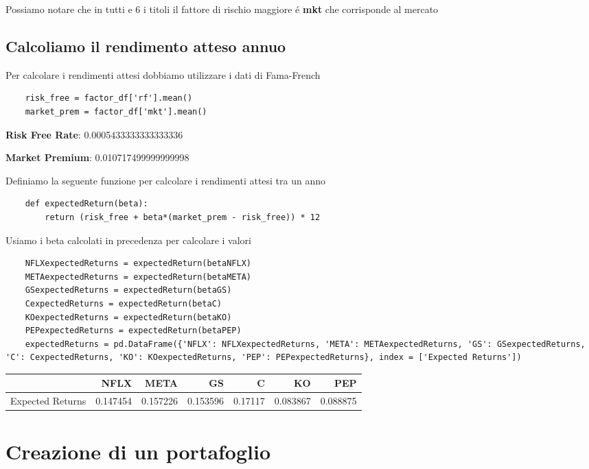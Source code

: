 \documentclass{report}
\begin{document}
Possiamo notare che in tutti e 6 i titoli il fattore di rischio maggiore é \textbf{mkt} che corrisponde al mercato

\section{Calcoliamo il rendimento atteso annuo}
Per calcolare i rendimenti attesi dobbiamo utilizzare i dati di Fama-French
\begin{lstlisting}
    risk_free = factor_df['rf'].mean()
    market_prem = factor_df['mkt'].mean()
\end{lstlisting}

\noindent\textbf{Risk Free Rate}:  0.0005433333333333336

\noindent\textbf{Market Premium}:  0.010717499999999998

Definiamo la seguente funzione per calcolare i rendimenti attesi tra un anno
\begin{lstlisting}
    def expectedReturn(beta):
        return (risk_free + beta*(market_prem - risk_free)) * 12
\end{lstlisting}
Usiamo i beta calcolati in precedenza per calcolare i valori
\begin{lstlisting}
    NFLXexpectedReturns = expectedReturn(betaNFLX)
    METAexpectedReturns = expectedReturn(betaMETA)
    GSexpectedReturns = expectedReturn(betaGS)
    CexpectedReturns = expectedReturn(betaC)
    KOexpectedReturns = expectedReturn(betaKO)
    PEPexpectedReturns = expectedReturn(betaPEP)
    expectedReturns = pd.DataFrame({'NFLX': NFLXexpectedReturns, 'META': METAexpectedReturns, 'GS': GSexpectedReturns, 'C': CexpectedReturns, 'KO': KOexpectedReturns, 'PEP': PEPexpectedReturns}, index = ['Expected Returns'])
\end{lstlisting}

\begin{tabular}{lrrrrrr}
\toprule
{} &      NFLX &      META &        GS &        C &        KO &       PEP \\
\midrule
Expected Returns &  0.147454 &  0.157226 &  0.153596 &  0.17117 &  0.083867 &  0.088875 \\
\bottomrule
\end{tabular}


\chapter{Creazione di un portafoglio}
\end{document}
